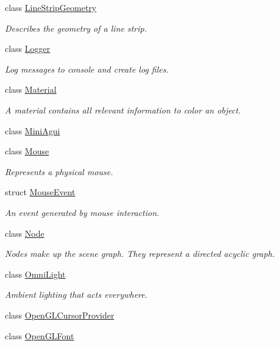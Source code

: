 \begin{DoxyCompactItemize}
class \mbox{\hyperlink{classec_1_1_line_strip_geometry}{Line\+Strip\+Geometry}}
\begin{DoxyCompactList}\small\item\em Describes the geometry of a line strip. \end{DoxyCompactList}\item 
class \mbox{\hyperlink{classec_1_1_logger}{Logger}}
\begin{DoxyCompactList}\small\item\em Log messages to console and create log files. \end{DoxyCompactList}\item 
class \mbox{\hyperlink{classec_1_1_material}{Material}}
\begin{DoxyCompactList}\small\item\em A material contains all relevant information to color an object. \end{DoxyCompactList}\item 
class \mbox{\hyperlink{classec_1_1_mini_agui}{Mini\+Agui}}
\item 
class \mbox{\hyperlink{classec_1_1_mouse}{Mouse}}
\begin{DoxyCompactList}\small\item\em Represents a physical mouse. \end{DoxyCompactList}\item 
struct \mbox{\hyperlink{structec_1_1_mouse_event}{Mouse\+Event}}
\begin{DoxyCompactList}\small\item\em An event generated by mouse interaction. \end{DoxyCompactList}\item 
class \mbox{\hyperlink{classec_1_1_node}{Node}}
\begin{DoxyCompactList}\small\item\em Nodes make up the scene graph. They represent a directed acyclic graph. \end{DoxyCompactList}\item 
class \mbox{\hyperlink{classec_1_1_omni_light}{Omni\+Light}}
\begin{DoxyCompactList}\small\item\em Ambient lighting that acts everywhere. \end{DoxyCompactList}\item 
class \mbox{\hyperlink{classec_1_1_open_g_l_cursor_provider}{Open\+G\+L\+Cursor\+Provider}}
\item 
class \mbox{\hyperlink{classec_1_1_open_g_l_font}{Open\+G\+L\+Font}}

\end{DoxyCompactItemize}
